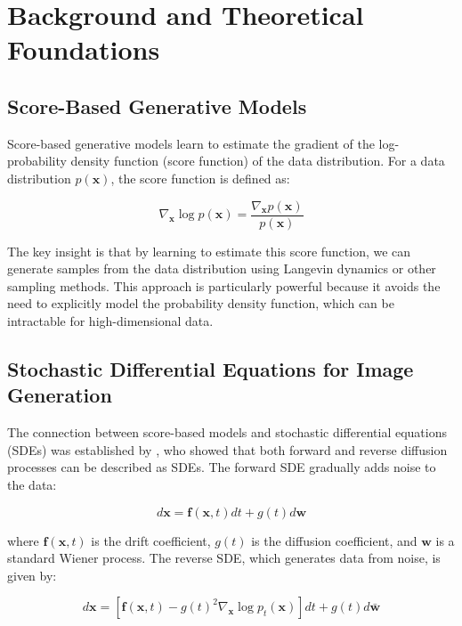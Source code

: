 \documentclass{midl} %
\begin{document}
\section{Background and Theoretical Foundations}

\subsection{Score-Based Generative Models}

Score-based generative models learn to estimate the gradient of the log-probability density function (score function) of the data distribution. For a data distribution $p(\mathbf{x})$, the score function is defined as:

\begin{equation}
\nabla_{\mathbf{x}} \log p(\mathbf{x}) = \frac{\nabla_{\mathbf{x}} p(\mathbf{x})}{p(\mathbf{x})}
\end{equation}

The key insight is that by learning to estimate this score function, we can generate samples from the data distribution using Langevin dynamics or other sampling methods. This approach is particularly powerful because it avoids the need to explicitly model the probability density function, which can be intractable for high-dimensional data.

\subsection{Stochastic Differential Equations for Image Generation}

The connection between score-based models and stochastic differential equations (SDEs) was established by \citet{song2021score}, who showed that both forward and reverse diffusion processes can be described as SDEs. The forward SDE gradually adds noise to the data:

\begin{equation}
d\mathbf{x} = \mathbf{f}(\mathbf{x}, t)dt + g(t)d\mathbf{w}
\end{equation}

where $\mathbf{f}(\mathbf{x}, t)$ is the drift coefficient, $g(t)$ is the diffusion coefficient, and $\mathbf{w}$ is a standard Wiener process. The reverse SDE, which generates data from noise, is given by:

\begin{equation}
d\mathbf{x} = [\mathbf{f}(\mathbf{x}, t) - g(t)^2 \nabla_{\mathbf{x}} \log p_t(\mathbf{x})]dt + g(t)d\bar{\mathbf{w}}
\end{equation}
\end{document}
